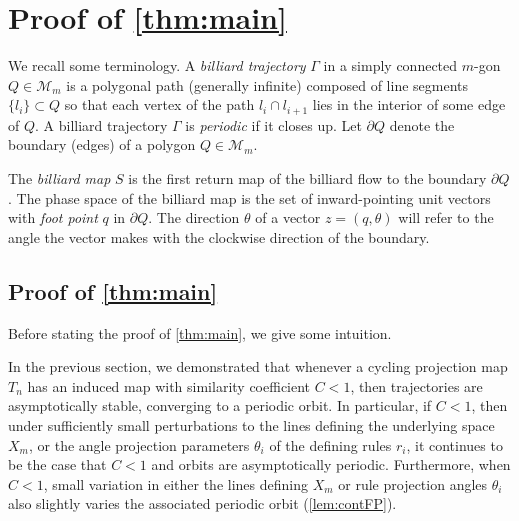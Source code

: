 \documentclass[12pt]{amsart}
\theoremstyle{theorem}
\theoremstyle{remark}
\numberwithin{equation}{section}
\newcommand{\cM}{\mathcal{M}}
\begin{document}
\section{Proof of \cref{thm:main}}\label{secProofs}

We recall some terminology.
A \emph{billiard trajectory} $\Gamma$ in a simply connected $m$-gon $Q \in \cM_m$ is a polygonal path (generally infinite) composed of line segments $\{l_i\} \subset Q$ so that each vertex of the path $l_i \cap l_{i+1}$ lies in the interior of some edge of $Q$. A billiard trajectory $\Gamma$ is \emph{periodic} if it closes up.
Let $\partial Q$ denote the boundary (edges) of a polygon $Q \in \cM_m$.

The \emph{billiard map} $S$ is the first return map of the billiard flow to the boundary $\partial Q$. The phase space of the billiard map is the set of inward-pointing unit vectors with \emph{foot point} $q$ in $\partial Q$. The direction $\theta$ of a vector $z = (q, \theta)$ will refer to the angle the vector makes with the clockwise direction of the boundary.




\subsection{Proof of \cref{thm:main}}

Before stating the proof of \cref{thm:main}, we give some intuition.

In the previous section, we demonstrated that whenever a cycling projection map $T_n$ has an induced map with similarity coefficient $C<1$, then trajectories are asymptotically stable, converging to a periodic orbit. In particular, if $C<1$, then under sufficiently small perturbations to the lines defining the underlying space $X_m$, or the angle projection parameters $\theta_i$ of the defining rules $r_i$, it continues to be the case that $C<1$ and orbits are asymptotically periodic. Furthermore, when $C<1$, small variation in either the lines defining $X_m$ or rule projection angles $\theta_i$ also slightly varies the associated periodic orbit (\cref{lem:contFP}).
\end{document}
